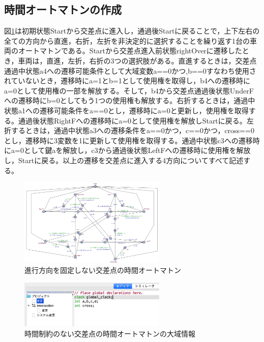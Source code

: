 \documentclass[twocolumn,10pt]{jsarticle}
\begin{document}
	\subsection{時間オートマトンの作成}	
	図\ref{IB}は初期状態Startから交差点に進入し，通過後Startに戻ることで，上下左右の全ての方向から直進，右折，左折を非決定的に選択することを繰り返す1台の車両のオートマトンである。Startから交差点進入前状態rightOverに遷移したとき，車両は，直進，左折，右折の3つの選択肢がある。直進するときは，交差点通過中状態a4への遷移可能条件として大域変数a==0かつ,b==0すなわち使用されていないとき，遷移時にa=1とb=1として使用権を取得し，b4への遷移時にa=0として使用権の一部を解放する。そして，b4から交差点通過後状態UnderFへの遷移時にb=0としてもう1つの使用権も解放する。右折するときは，通過中状態a1への遷移可能条件をa==0とし，遷移時にa=0と更新し，使用権を取得する。通過後状態RightFへの遷移時にa=0として使用権を解放しStartに戻る。左折するときは，通過中状態a3への遷移条件をa==0かつ，c==0かつ，cross==0とし，遷移時に3変数を1に更新して使用権を取得する。通過中状態c3への遷移時にa=0として鍵aを解放し，c3から通過後状態LeftFへの遷移時に使用権を解放し，Startに戻る。以上の遷移を交差点に進入する4方向についてすべて記述する。
	\begin{figure}[htbp]
	\centering
	\includegraphics[width=70mm]{IntersectionBig.png}
	\caption{進行方向を固定しない交差点の時間オートマトン}
	\label{IB}
	\end{figure}
	\begin{figure}[htbp]
	\centering
	\includegraphics[width=70mm]{IBSimuGD.png}
	\caption{時間制約のない交差点の時間オートマトンの大域情報}
	\label{IBSi}
	\end{figure}
\end{document}
